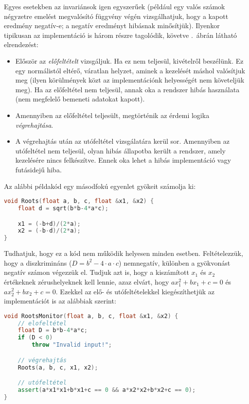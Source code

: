 Egyes esetekben az invariánsok igen egyszerűek (például egy valós számok négyzetre emelést megvalósító függvény végén vizsgálhatjuk, hogy a kapott eredmény negatív-e; a negatív eredményt hibásnak minősítjük). Ilyenkor tipikusan az implementáció is három részre tagolódik, követve .~ábrán látható elrendezést:
\begin{itemize}
\item Először az \emph{előfeltételt} vizsgáljuk. Ha ez nem teljesül, kivételről beszélünk. Ez egy normálistól eltérő, váratlan helyzet, aminek a kezelését máshol valósítjuk meg (ilyen körülmények közt az implementációnk helyességét nem követeljük meg). Ha az előfeltétel nem teljesül, annak oka a rendszer hibás használata (nem megfelelő bemeneti adatokat kapott).
\item Amennyiben az előfeltétel teljesült, megtörténik az érdemi logika \emph{végrehajtása}.
\item A végrehajtás után az utófeltétel vizsgálatára kerül sor. Amennyiben az utófeltétel nem teljesül, olyan hibás állapotba került a rendszer, amely kezelésére nincs felkészítve. Ennek oka lehet a hibás implementáció vagy futásidejű hiba.
\end{itemize}

\begin{megjegyzes}
Az alábbi példakód egy másodfokú egyenlet gyökeit számolja ki:

\begin{lstlisting}[language=C++]
void Roots(float a, b, c, float &x1, &x2) {
    float d = sqrt(b*b-4*a*c);

    x1 = (-b+d)/(2*a);
    x2 = (-b-d)/(2*a);
}
\end{lstlisting}

Tudhatjuk, hogy ez a kód nem működik helyesen minden esetben. Feltételezzük, hogy a diszkrimináns ($D=b^2-4\cdot a\cdot c$) nemnegatív, különben a gyökvonást negatív számon végezzük el. Tudjuk azt is, hogy a kiszámított $x_1$ és $x_2$ értékeknek zérushelyeknek kell lennie, azaz elvárt, hogy $ax_1^2 + bx_1 + c = 0$ és $ax_2^2 + bx_2 + c = 0$. Ezekkel az elő- és utófeltételekkel kiegészíthetjük az implementációt is az alábbiak szerint:


\begin{lstlisting}[language=C++,morekeywords={assert}]
void RootsMonitor(float a, b, c, float &x1, &x2) {
    // elofeltétel
    float D = b*b-4*a*c;
    if (D < 0)
        throw "Invalid input!";

    // végrehajtás
    Roots(a, b, c, x1, x2);

    // utófeltétel
    assert(a*x1*x1+b*x1+c == 0 && a*x2*x2+b*x2+c == 0);
}
\end{lstlisting}
\end{megjegyzes}


